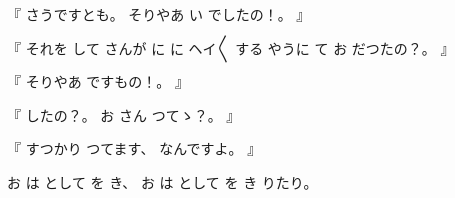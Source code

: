 %
『
さうですとも。
%
そりやあ
い
でしたの！。
』

%
『
それを
して
さんが
に
に
ヘイ〳〵
する
やうに
て
お
だつたの？。
』

%
『
そりやあ
ですもの！。
』

%
『
したの？。
%
お
さん
つてゝ？。
』

%
『
すつかり
つてます、
%
なんですよ。
』

%
お
は
として
を
き、
%
お
は
として
を
き
りたり。
